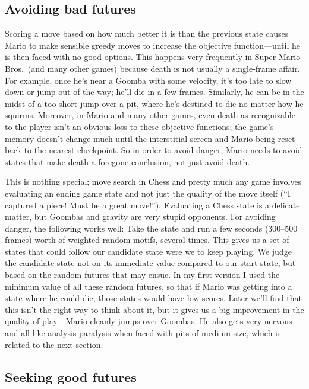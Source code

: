 \documentclass[twocolumn]{article}
\begin{document}
\subsection{Avoiding bad futures}

Scoring a move based on how much better it is than the previous state
causes Mario to make sensible greedy moves to increase the objective
function---until he is then faced with no good options. This happens
very frequently in Super Mario Bros.~(and many other games) because
death is not usually a single-frame affair. For example, once he's
near a Goomba with some velocity, it's too late to slow down or jump
out of the way; he'll die in a few frames. Similarly, he can be in the
midst of a too-short jump over a pit, where he's destined to die no
matter how he squirms. Moreover, in Mario and many other games, even
death as recognizable to the player isn't an obvious loss to these
objective functions; the game's memory doesn't change much until the
interstitial screen and Mario being reset back to the nearest
checkpoint. So in order to avoid danger, Mario needs to avoid states
that make death a foregone conclusion, not just avoid death.

This is nothing special; move search in Chess and pretty much any game
involves evaluating an ending game state and not just the quality of
the move itself (``I captured a piece! Must be a great move!'').
Evaluating a Chess state is a delicate matter, but Goombas and gravity
are very stupid opponents. For avoiding danger, the following works
well: Take the state and run a few seconds (300--500 frames) worth of
weighted random motifs, several times. This gives us a set of states
that could follow our candidate state were we to keep playing. We
judge the candidate state not on its immediate value compared to our
start state, but based on the random futures that may ensue. In my
first version I used the minimum value of all these random futures, so
that if Mario was getting into a state where he could die, those
states would have low scores. Later we'll find that this isn't the
right way to think about it, but it gives us a big improvement in the
quality of play---Mario cleanly jumps over Goombas. He also gets very
nervous and all like analysis-paralysis when faced with pits of medium
size, which is related to the next section. %

\subsection{Seeking good futures}
\end{document}
